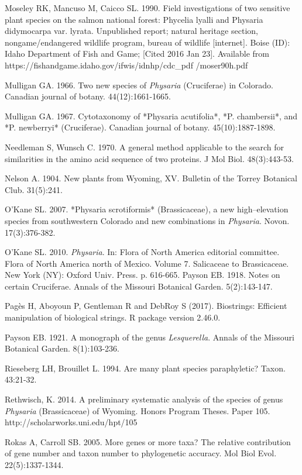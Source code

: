 Moseley RK, Mancuso M, Caicco SL. 1990. Field investigations of two sensitive plant species on the salmon national forest: Phycelia lyalli and Physaria didymocarpa var. lyrata. Unpublished report; natural heritage section, nongame/endangered wildlife program, bureau of wildlife [internet]. Boise (ID): Idaho Department of Fish and Game; [Cited 2016 Jan 23]. Available from https://fishandgame.idaho.gov/ifwis/idnhp/cdc\_pdf /moser90h.pdf

Mulligan GA. 1966. Two new species of \textit{Physaria} (Cruciferae) in Colorado. Canadian journal of botany. 44(12):1661-1665.

Mulligan GA. 1967. Cytotaxonomy of *Physaria acutifolia*, *P. chambersii*, and *P. newberryi* (Cruciferae). Canadian journal of botany. 45(10):1887-1898.

Needleman S, Wunsch C.  1970. A general method applicable to the search for similarities in the amino acid sequence of two proteins. J Mol Biol. 48(3):443-53.

Nelson A. 1904. New plants from Wyoming, XV. Bulletin of the Torrey Botanical Club. 31(5):241.

O’Kane SL. 2007. *Physaria scrotiformis* (Brassicaceae), a new high–elevation species from southwestern Colorado and new combinations in \textit{Physaria}. Novon. 17(3):376-382.

O’Kane SL. 2010. \textit{Physaria}. In: Flora of North America editorial committee. Flora of North America north of Mexico. Volume 7. Salicaceae to Brassicaceae. New York (NY): Oxford Univ. Press. p. 616-665. 
Payson EB. 1918. Notes on certain Cruciferae. Annals of the Missouri Botanical Garden. 5(2):143-147.

Pagès H, Aboyoun P, Gentleman R and DebRoy S (2017). Biostrings: Efficient manipulation of biological strings. R package version 2.46.0. 

Payson EB. 1921. A monograph of the genus \textit{Lesquerella}. Annals of the Missouri Botanical Garden. 8(1):103-236.

Rieseberg LH, Brouillet L. 1994. Are many plant species paraphyletic? Taxon. 43:21-32.

Rethwisch, K. 2014. A preliminary systematic analysis of the species of genus \textit{Physaria} (Brassicaceae) of Wyoming. Honors Program Theses. Paper 105.
http://scholarworks.uni.edu/hpt/105

Rokas A, Carroll SB. 2005. More genes or more taxa? The relative contribution of gene number and taxon number to phylogenetic accuracy. Mol Biol Evol. 22(5):1337-1344.

